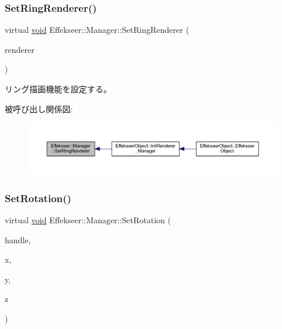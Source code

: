 \subsubsection{\texorpdfstring{Set\+Ring\+Renderer()}{SetRingRenderer()}}
{\footnotesize\ttfamily virtual \mbox{\hyperlink{namespace_effekseer_ab34c4088e512200cf4c2716f168deb56}{void}} Effekseer\+::\+Manager\+::\+Set\+Ring\+Renderer (\begin{DoxyParamCaption}\item[{\mbox{\hyperlink{class_effekseer_1_1_ring_renderer}{Ring\+Renderer}} $\ast$}]{renderer }\end{DoxyParamCaption})\hspace{0.3cm}{\ttfamily [pure virtual]}}



リング描画機能を設定する。 

被呼び出し関係図\+:\nopagebreak
\begin{figure}[H]
\begin{center}
\leavevmode
\includegraphics[width=350pt]{class_effekseer_1_1_manager_afe6f77af79fd2bea3a36eed5b5dea383_icgraph}
\end{center}
\end{figure}
\mbox{\label{class_effekseer_1_1_manager_aab0df458615143d664e8f84d176a5be6}} 
\subsubsection{\texorpdfstring{Set\+Rotation()}{SetRotation()}\hspace{0.1cm}{\footnotesize\ttfamily [1/2]}}
{\footnotesize\ttfamily virtual \mbox{\hyperlink{namespace_effekseer_ab34c4088e512200cf4c2716f168deb56}{void}} Effekseer\+::\+Manager\+::\+Set\+Rotation (\begin{DoxyParamCaption}\item[{\mbox{\hyperlink{namespace_effekseer_afba58b8d812da862190e9bbfc040824a}{Handle}}}]{handle,  }\item[{float}]{x,  }\item[{float}]{y,  }\item[{float}]{z }\end{DoxyParamCaption})\hspace{0.3cm}{\ttfamily [pure virtual]}}




